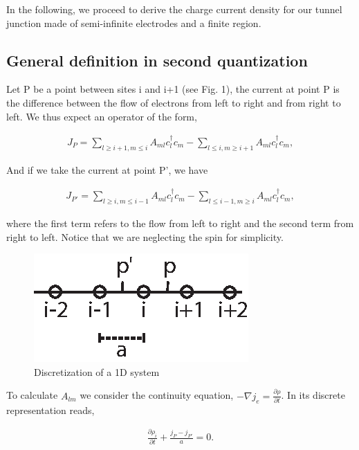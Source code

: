 \documentclass[10pt,prb,showpacs,amssymb,floatfix]{revtex4-1}
\newcommand{\pat}{\partial}
\begin{document}
In the following, we proceed to derive the charge current density for our tunnel junction made of semi-infinite electrodes and a finite region.

\subsection{General definition in second quantization}

Let P be a point between sites i and i+1 (see Fig. 1), the current at point P is the difference between the flow of electrons from left to right and from right to left. We thus expect an operator of the form,

\begin{align}
J_P = \sum_{l \geq i+1, m \leq i} A_{ml} c^\dagger_l c_m - \sum_{l \leq i, m \geq i+1} A_{ml}c^\dagger_l c_m,
\label{jp}
\end{align}

And if we take the current at point P', we have

\begin{align}
J_{P'}= \sum_{l \geq i, m \leq i-1} A_{ml} c^\dagger_l c_m - \sum_{l \leq i-1, m \geq i} A_{ml}c^\dagger_l c_m,
\label{jpp}
\end{align}

where the first term refers to the flow from left to right and the second term from right to left. Notice that we are neglecting the spin for simplicity.

\begin{figure}[ht]
\centering
\includegraphics{fig4.eps}
\caption{Discretization of a 1D system}
\label{2ndq}
\end{figure}

To calculate $A_{lm}$ we consider the continuity equation, $-\nabla j_e = \frac{\pat \rho}{\pat t}$. In its discrete representation reads,

\begin{align}
 \frac{\pat \rho_i}{\pat t} + \frac{j_P - j_{P'}}{a} = 0.
 \label{conti}
\end{align}
\end{document}
